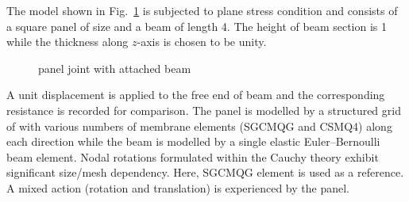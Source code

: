 \documentclass[3p,sort&compress,11pt,fleqn]{elsarticle}
\newcommand*{\figref}[1]{Fig.~\ref{#1}}
\begin{document}
The model shown in \figref{fig:joint_example} is subjected to plane stress condition and consists of a square panel of size  and a beam of length \num{4}. The height of beam section is \num{1} while the thickness along $z$-axis is chosen to be unity.
\begin{figure}[htb]
\centering\footnotesize
{}
\caption{panel joint with attached beam}\label{fig:joint_example}
\end{figure}
A unit displacement is applied to the free end of beam and the corresponding resistance is recorded for comparison. The panel is modelled by a structured grid of with various numbers of membrane elements (SGCMQG \citep{Chang2020} and CSMQ4) along each direction while the beam is modelled by a single elastic Euler--Bernoulli beam element. Nodal rotations formulated within the Cauchy theory exhibit significant size/mesh dependency. Here, SGCMQG element is used as a reference. A mixed action (rotation and translation) is experienced by the panel.
\end{document}

